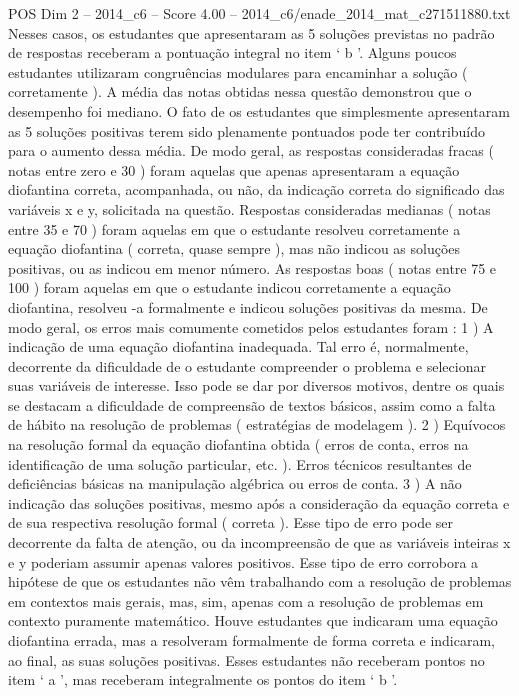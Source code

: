 \begin{textsample}{POS Dim 2 – 2014\_c6 – Score 4.00 – 2014\_c6/enade\_2014\_mat\_c271511880.txt}
Nesses casos, os estudantes que apresentaram as 5 soluções previstas no padrão de respostas receberam a pontuação integral no item ‘ b ’.
Alguns poucos estudantes utilizaram congruências modulares para encaminhar a solução ( corretamente ).
A média das notas obtidas nessa questão demonstrou que o desempenho foi mediano.
O fato de os estudantes que simplesmente apresentaram as 5 soluções positivas terem sido plenamente pontuados pode ter contribuído para o aumento dessa média.
De modo geral, as respostas consideradas fracas ( notas entre zero e 30 ) foram aquelas que apenas apresentaram a equação diofantina correta, acompanhada, ou não, da indicação correta do significado das variáveis x e y, solicitada na questão.
Respostas consideradas medianas ( notas entre 35 e 70 ) foram aquelas em que o estudante resolveu corretamente a equação diofantina ( correta, quase sempre ), mas não indicou as soluções positivas, ou as indicou em menor número.
As respostas boas ( notas entre 75 e 100 ) foram aquelas em que o estudante indicou corretamente a equação diofantina, resolveu -a formalmente e indicou soluções positivas da mesma.
De modo geral, os erros mais comumente cometidos pelos estudantes foram : 1 ) A indicação de uma equação diofantina inadequada.
Tal erro é, normalmente, decorrente da dificuldade de o estudante compreender o problema e selecionar suas variáveis de interesse.
Isso pode se dar por diversos motivos, dentre os quais se destacam a dificuldade de compreensão de textos básicos, assim como a falta de hábito na resolução de problemas ( estratégias de modelagem ). 2 ) Equívocos na resolução formal da equação diofantina obtida ( erros de conta, erros na identificação de uma solução particular, etc. ).
Erros técnicos resultantes de deficiências básicas na manipulação algébrica ou erros de conta. 3 ) A não indicação das soluções positivas, mesmo após a consideração da equação correta e de sua respectiva resolução formal ( correta ).
Esse tipo de erro pode ser decorrente da falta de atenção, ou da incompreensão de que as variáveis inteiras x e y poderiam assumir apenas valores positivos.
Esse tipo de erro corrobora a hipótese de que os estudantes não vêm trabalhando com a resolução de problemas em contextos mais gerais, mas, sim, apenas com a resolução de problemas em contexto puramente matemático.
Houve estudantes que indicaram uma equação diofantina errada, mas a resolveram formalmente de forma correta e indicaram, ao final, as suas soluções positivas.
Esses estudantes não receberam pontos no item ‘ a ’, mas receberam integralmente os pontos do item ‘ b ’.

\end{textsample}
